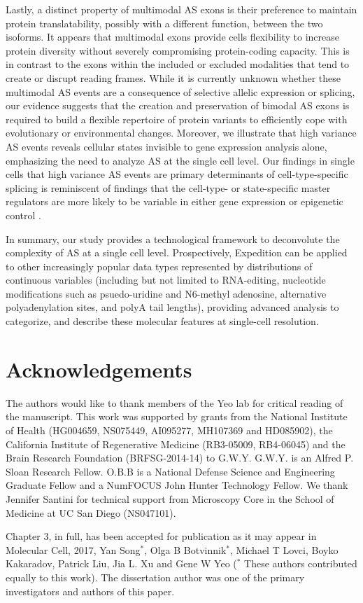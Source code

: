 Lastly, a distinct property of multimodal AS exons is their preference to maintain protein translatability, possibly with a different function, between the two isoforms. It appears that multimodal exons provide cells flexibility to increase protein diversity without severely compromising protein-coding capacity. This is in contrast to the exons within the included or excluded modalities that tend to create or disrupt reading frames. While it is currently unknown whether these multimodal AS events are a consequence of selective allelic expression or splicing, our evidence suggests that the creation and preservation of bimodal AS exons is required to build a flexible repertoire of protein variants to efficiently cope with evolutionary or environmental changes. Moreover, we illustrate that high variance AS events reveals cellular states invisible to gene expression analysis alone, emphasizing the need to analyze AS at the single cell level. Our findings in single cells that high variance AS events are primary determinants of cell-type-specific splicing is reminiscent of findings that the cell-type- or state-specific master regulators are more likely to be variable in either gene expression \cite{Shalek2013-ez,Shalek2014-ce} or epigenetic control \cite{Buenrostro:2015jfb}.

In summary, our study provides a technological framework to deconvolute the complexity of AS at a single cell level. Prospectively, Expedition can be applied to other increasingly popular data types represented by distributions of continuous variables (including but not limited to RNA-editing, nucleotide modifications such as psuedo-uridine and N6-methyl adenosine, alternative polyadenylation sites, and polyA tail lengths), providing advanced analysis to categorize, and describe these molecular features at single-cell resolution.

\section{Acknowledgements}
The authors would like to thank members of the Yeo lab for critical reading of the manuscript.  This work was supported by grants from the National Institute of Health (HG004659, NS075449, AI095277, MH107369 and HD085902), the California Institute of Regenerative Medicine (RB3-05009, RB4-06045) and the Brain Research Foundation (BRFSG-2014-14) to G.W.Y. G.W.Y. is an Alfred P. Sloan Research Fellow. O.B.B is a National Defense Science and Engineering Graduate Fellow and a NumFOCUS John Hunter Technology Fellow. We thank Jennifer Santini for technical support from Microscopy Core in the School of Medicine at UC San Diego (NS047101).

Chapter 3, in full, has been accepted for publication as it may appear in Molecular Cell, 2017, Yan Song$^*$, Olga B Botvinnik$^*$, Michael T Lovci, Boyko Kakaradov, Patrick Liu, Jia L. Xu and Gene W Yeo ($^*$ These authors contributed equally to this work).  The dissertation author was one of the primary investigators and authors of this paper. 